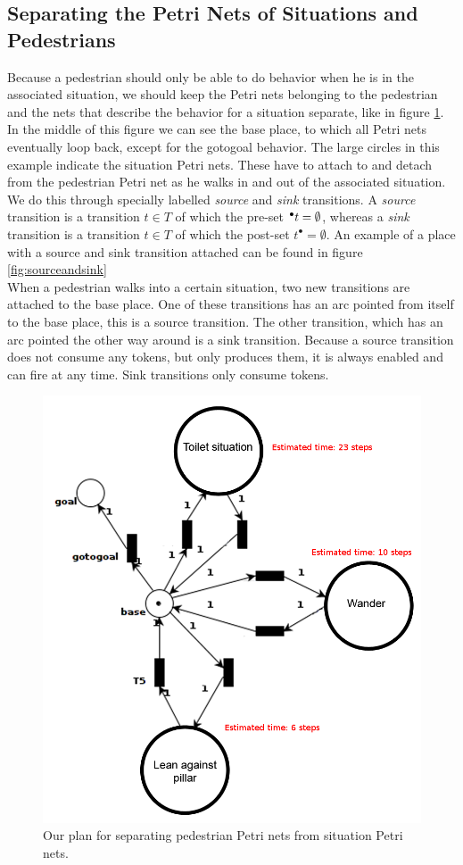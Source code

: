 \documentclass[11pt, a4paper]{book}
\begin{document}
\subsection{Separating the Petri Nets of Situations and Pedestrians}
Because a pedestrian should only be able to do behavior when he is in the associated situation, we should keep the Petri nets belonging to the pedestrian and the nets that describe the behavior for a situation separate, like in figure \ref{petrinetexample}. In the middle of this figure we can see the base place, to which all Petri nets eventually loop back, except for the gotogoal behavior. The large circles in this example indicate the situation Petri nets. These have to attach to and detach from the pedestrian Petri net as he walks in and out of the associated situation. We do this through specially labelled \emph{source} and \emph{sink} transitions.
A \emph{source} transition is a transition $t \in T$ of which the pre-set $\prescript{\bullet}{}{t} = \emptyset$, whereas a \emph{sink} transition is a transition $t \in T$ of which the post-set $t^{\bullet} = \emptyset$. An example of a place with a source and sink transition attached can be found in figure \ref{fig:sourceandsink}\\
 When a pedestrian walks into a certain situation, two new transitions are attached to the base place. One of these transitions has an arc pointed from itself to the base place, this is a source transition. The other transition, which has an arc pointed the other way around is a sink transition. Because a source transition does not consume any tokens, but only produces them, it is always enabled and can fire at any time. Sink transitions only consume tokens.\\
\begin{figure}[h!]
\centering
\includegraphics[width=.6\textwidth]{petrinet_pictures/example_2_copy.png}
\caption{Our plan for separating pedestrian Petri nets from situation Petri nets.}
\label{petrinetexample}
\end{figure}
\end{document}
